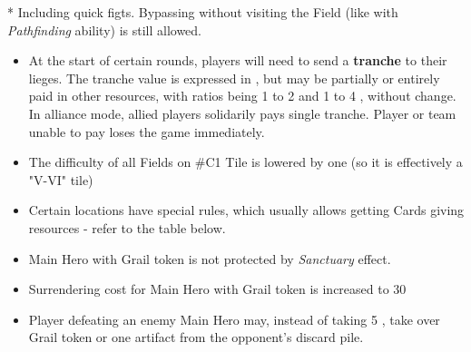\begin{multicols*}{2}
    \begin{table*}[b!]
        * Including quick figts. Bypassing without visiting the Field (like with \textit{Pathfinding} ability) is still allowed.
    \end{table*}

    \begin{itemize}
        \item At the start of certain rounds, players will need to send a \textbf{tranche} to their lieges. The tranche value is expressed in , but may be partially or entirely paid in other resources, with ratios being 1  to 2  and 1  to 4 , without change. In alliance mode, allied players solidarily pays single tranche. Player or team unable to pay loses the game immediately.
        \item The difficulty of all Fields on \#C1 Tile is lowered by one (so it is effectively a "V-VI" tile)
        \item Certain locations have special rules, which usually allows getting Cards giving resources - refer to the table below.
        \item Main Hero with Grail token is not protected by \textit{Sanctuary} effect.
        \item Surrendering cost for Main Hero with Grail token is increased to 30
        \item Player defeating an enemy Main Hero may, instead of taking 5 , take over Grail token or one artifact from the opponent's discard pile.
    \end{itemize}


\end{multicols*}
